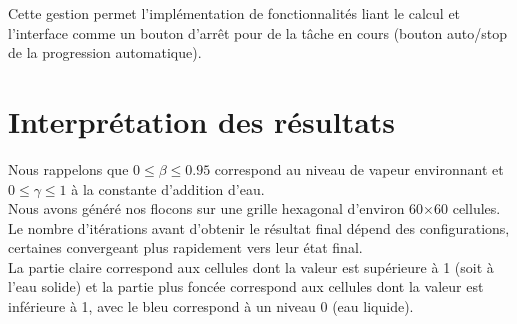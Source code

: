 \documentclass[a4paper,12pt,twoside]{report}
\begin{document}
Cette gestion permet l'implémentation de fonctionnalités liant le calcul et l'interface comme un bouton d'arrêt pour de la tâche en cours (bouton auto/stop de la progression automatique).

\chapter{Interprétation des résultats}Nous rappelons que $0\le\beta\le0.95$ correspond au niveau de vapeur environnant et $0\le\gamma\le1$ à la constante d’addition d’eau.\\Nous avons généré nos flocons sur une grille hexagonal d’environ 60$\times$60 cellules.\\Le nombre d’itérations avant d’obtenir le résultat final dépend des configurations, certaines convergeant plus rapidement vers leur état final.\\La partie claire correspond aux cellules dont la valeur est supérieure à 1 (soit à l’eau solide) et la partie plus foncée correspond aux cellules dont la valeur est inférieure à 1, avec le bleu correspond à un niveau 0 (eau liquide).
\medbreak
\end{document}
